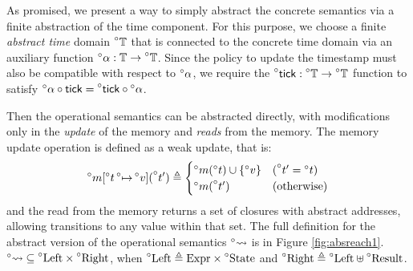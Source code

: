 \documentclass{article}
\theoremstyle{definition}
\newcommand*{\A}[1]{\prescript{\circ}{}{#1}}
\newcommand*{\Expr}{\text{Expr}}
\newcommand*{\Time}{\mathbb{T}}
\newcommand*{\Left}{\text{Left}}
\newcommand*{\Right}{\text{Right}}
\newcommand*{\mem}{m}
\newcommand*{\State}{\text{State}}
\newcommand*{\Result}{\text{Result}}
\newcommand*{\semarrow}{\rightsquigarrow}
\newcommand*{\tick}{\mathsf{tick}}
\begin{document}
As promised, we present a way to simply abstract the concrete semantics via a finite abstraction of the time component.
For this purpose, we choose a finite \emph{abstract time} domain $\A\Time$ that is connected to the concrete time domain via an auxiliary function $\A\alpha:\Time\rightarrow\A\Time$.
Since the policy to update the timestamp must also be compatible with respect to $\A\alpha$, we require the $\A\tick:\A\Time\rightarrow\A\Time$ function to satisfy $\A\alpha\circ\tick=\A\tick\circ\A\alpha$.

Then the operational semantics can be abstracted directly, with modifications only in the \emph{update} of the memory and \emph{reads} from the memory.
The memory update operation is defined as a weak update, that is:
\[
  \A{\mem}[\A{t}\A{\mapsto}\A{v}](\A{t'})\triangleq
  \begin{cases}
    \A{\mem}(\A{t})\cup\{\A{v}\} & (\A{t'}=\A{t})     \\
    \A{\mem}(\A{t'})             & (\text{otherwise})
  \end{cases}
\]
and the read from the memory returns a set of closures with abstract addresses, allowing transitions to any value within that set.
The full definition for the abstract version of the operational semantics $\A\semarrow$ is in Figure \ref{fig:absreach1}.
$\A\semarrow\subseteq\A\Left\times\A\Right$, when $\A\Left\triangleq\Expr\times\A\State$ and $\A\Right\triangleq\A\Left\uplus\A\Result$.
\end{document}

